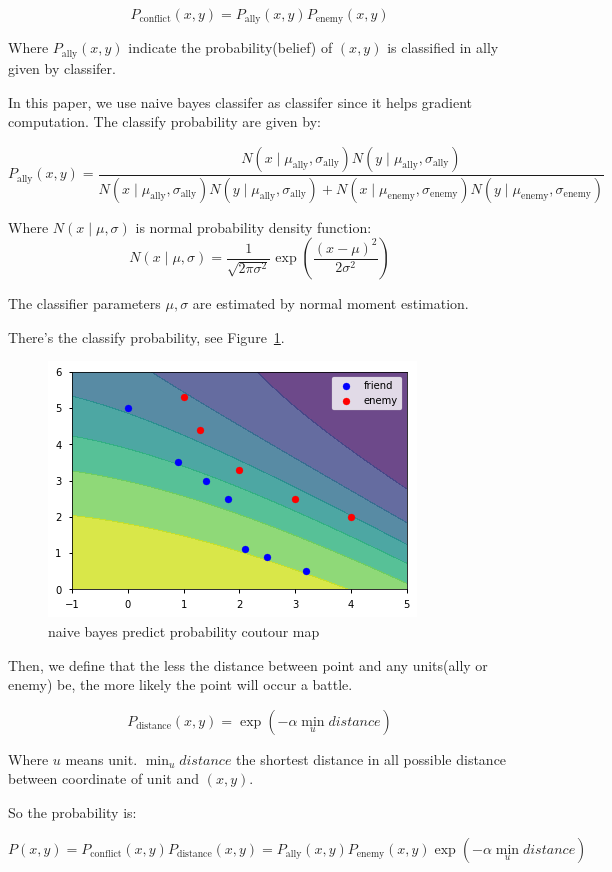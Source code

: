 \documentclass{article}
\begin{document}
$$
P_{\text{conflict}}(x,y) = P_\text{ally}(x,y) P_\text{enemy}(x,y)
$$

Where $P_\text{ally}(x,y)$ indicate the probability(belief) of $(x,y)$ is classified 
in ally given by classifer.

In this paper, we use naive bayes classifer as classifer since it helps gradient computation. The 
classify probability are given by:

$$
P_\text{ally}(x,y) = \frac{
N(x\mid \mu_\text{ally} ,\sigma_\text{ally}) N(y  \mid \mu_\text{ally}, \sigma_\text{ally})
}{
N(x \mid \mu_\text{ally} , \sigma_\text{ally}) N(y \mid \mu_\text{ally} , \sigma_\text{ally}) + 
N(x \mid \mu_\text{enemy} , \sigma_\text{enemy}) N(y \mid \mu_\text{enemy} , \sigma_\text{enemy})
}
$$

Where $N(x \mid \mu,\sigma)$ is normal probability density function:
$$
N(x \mid \mu,\sigma) = \frac{1}{\sqrt{2\pi \sigma^2}} \exp(\frac{(x-\mu)^2}{2\sigma^2})
$$

The classifier parameters $\mu,\sigma$ are estimated by normal moment estimation.

There's the classify probability, see Figure~\ref{fig:naivebayes}.

\begin{figure}[h!]
\includegraphics[width=0.6\linewidth]{naivebayes.png}
\caption{naive bayes predict probability coutour map}
\label{fig:naivebayes}
\end{figure}

Then, we define that the less the distance between point and any units(ally or enemy) be,
the more likely the point will occur a battle.

$$
P_{\text{distance}}(x,y) = \exp(-\alpha \min_{u} distance)
$$

Where $u$ means unit. $\min_u distance$ the shortest distance in all possible distance 
between coordinate of unit and $(x,y)$.

So the probability is:

$$
P(x,y) = P_{\text{conflict}}(x,y) P_{\text{distance}}(x,y) = 
P_\text{ally}(x,y) P_\text{enemy}(x,y) \exp(-\alpha \min_{u} distance)
$$
\end{document}
